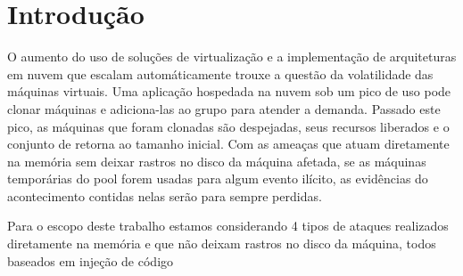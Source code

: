 \documentclass[
	12pt,				%
	openright,			%
	oneside,			%
	a4paper,			%
	english,			%
	brazil,				%
	]{abntex2}
\begin{document}
\frenchspacing 


\imprimircapa

\imprimirfolhaderosto


\tableofcontents
\cleardoublepage


\textual

\chapter{Introdução}
\label{chp:intro}

O aumento do uso de soluções de virtualização e a implementação de arquiteturas em nuvem que escalam automáticamente \cite{Amazon2016} trouxe a questão da volatilidade 
das máquinas virtuais. Uma aplicação hospedada na nuvem sob um pico de uso pode clonar máquinas e adiciona-las ao grupo para atender a demanda. Passado 
este pico, as máquinas que foram clonadas são despejadas, seus recursos liberados e o conjunto de retorna ao tamanho inicial. Com as ameaças que atuam diretamente 
na memória sem deixar rastros no disco da máquina afetada, se as máquinas temporárias do pool forem usadas para algum evento ilícito, as evidências do acontecimento 
contidas nelas serão para sempre perdidas.

Para o escopo deste trabalho estamos considerando 4 tipos de ataques realizados diretamente na memória e que não deixam rastros no disco da máquina, todos baseados 
em injeção de código \cite{Case2014}
\end{document}
